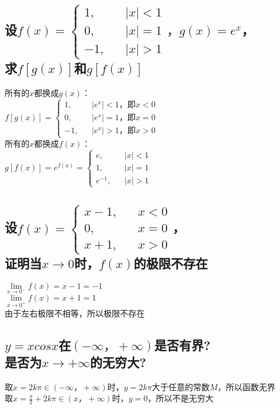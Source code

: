 \documentclass{article}
\begin{document}
\begin{flushleft}
\subsection{
设$f(x)=\left\{
\begin{array}{rcl}
1,& & |x|<1\\
0,& & |x|=1\\
-1,& & |x|>1
\end{array} \right.，g(x)=e^x$，\\
求$f[g(x)]$和$g[f(x)]$
}
所有的$x$都换成$g(x)$：\\
$f[g(x)]=\left\{
\begin{array}{rcl}
1,& & |e^x|<1，\mbox{即}x<0\\
0,& & |e^x|=1，\mbox{即}x=0\\
-1,& & |e^x|>1，\mbox{即}x>0
\end{array} \right.$\\
所有的$x$都换成$f(x)$：\\
$g[f(x)]=e^{f(x)}=\left\{
\begin{array}{rcl}
e,& & |x|<1\\
1,& & |x|=1\\
e^{-1},& & |x|>1
\end{array} \right.$\\

\subsection{
设$f(x)=\left\{
\begin{array}{rcl}
x-1,& & x<0\\
0,& & x=0\\
x+1,& & x>0
\end{array} \right.$，\\
证明当$x\to 0$时，$f(x)$的极限不存在
}
$\lim\limits_{x\to 0^-}f(x)=x-1=-1$\\
$\lim\limits_{x\to 0^+}f(x)=x+1=1$\\
由于左右极限不相等，所以极限不存在\\

\subsection{
$y=xcosx$在$(-\infty，+\infty)$是否有界?\\
是否为$x\to +\infty$的无穷大?
}
取$x=2k\pi\in(-\infty，+\infty)$时，$y=2k\pi$大于任意的常数$M$，所以函数无界\\
取$x=\frac{\pi}{2}+2k\pi\in(x，+\infty)$时，$y=0$，所以不是无穷大\\


\end{flushleft}
\end{document}
